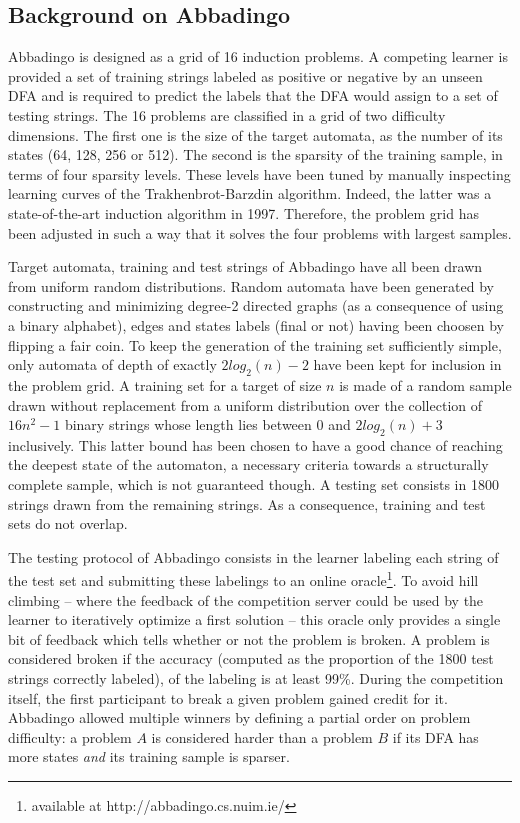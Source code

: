 \subsection{Background on Abbadingo}

Abbadingo is designed as a grid of 16 induction problems. A competing learner is provided a set of training strings labeled as positive or negative by an unseen DFA and is required to predict the labels that the DFA would assign to a set of testing strings. The 16 problems are classified in a grid of two difficulty dimensions. The first one is the size of the target automata, as the number of its states (64, 128, 256 or 512). The second is the sparsity of the training sample, in terms of four sparsity levels. These levels have been tuned by manually inspecting learning curves of the Trakhenbrot-Barzdin algorithm. Indeed, the latter was a state-of-the-art induction algorithm in 1997. Therefore, the problem grid has been adjusted in such a way that it solves the four problems with largest samples.

Target automata, training and test strings of Abbadingo have all been drawn from uniform random distributions. Random automata have been generated by constructing and minimizing degree-2 directed graphs (as a consequence of using a binary alphabet), edges and states labels (final or not) having been choosen by flipping a fair coin. To keep the generation of the training set sufficiently simple, only automata of depth of exactly $2log_2(n)-2$ have been kept for inclusion in the problem grid. A training set for a target of size $n$ is made of a random sample drawn without replacement from a uniform distribution over the collection of $16n^2 -1$ binary strings whose length lies between 0 and $2log_2(n)+3$ inclusively. This latter bound has been chosen to have a good chance of reaching the deepest state of the automaton, a necessary criteria towards a structurally complete sample, which is not guaranteed though. A testing set consists in 1800 strings drawn from the remaining strings. As a consequence, training and test sets do not overlap.

The testing protocol of Abbadingo consists in the learner labeling each string of the test set and submitting these labelings to an online oracle\footnote{available at http://abbadingo.cs.nuim.ie/}. To avoid hill climbing -- where the feedback of the competition server could be used by the learner to iteratively optimize a first solution -- this oracle only provides a single bit of feedback which tells whether or not the problem is broken. A problem is considered broken if the accuracy (computed as the proportion of the 1800 test strings correctly labeled), of the labeling is at least 99\%. During the competition itself, the first participant to break a given problem gained credit for it. Abbadingo allowed multiple winners by defining a partial order on problem difficulty: a problem $A$ is considered harder than a problem $B$ if its DFA has more states \emph{and} its training sample is sparser. 

